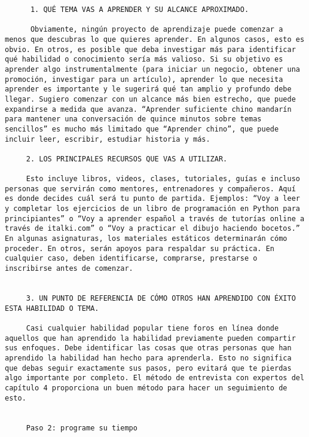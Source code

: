 \begin{verbatim}
	  1. QUÉ TEMA VAS A APRENDER Y SU ALCANCE APROXIMADO.
	  
	  Obviamente, ningún proyecto de aprendizaje puede comenzar a menos que descubras lo que quieres aprender. En algunos casos, esto es obvio. En otros, es posible que deba investigar más para identificar qué habilidad o conocimiento sería más valioso. Si su objetivo es aprender algo instrumentalmente (para iniciar un negocio, obtener una promoción, investigar para un artículo), aprender lo que necesita aprender es importante y le sugerirá qué tan amplio y profundo debe llegar. Sugiero comenzar con un alcance más bien estrecho, que puede expandirse a medida que avanza. “Aprender suficiente chino mandarín para mantener una conversación de quince minutos sobre temas sencillos” es mucho más limitado que “Aprender chino”, que puede incluir leer, escribir, estudiar historia y más.
	 
	 2. LOS PRINCIPALES RECURSOS QUE VAS A UTILIZAR.
	 
	 Esto incluye libros, videos, clases, tutoriales, guías e incluso personas que servirán como mentores, entrenadores y compañeros. Aquí es donde decides cuál será tu punto de partida. Ejemplos: “Voy a leer y completar los ejercicios de un libro de programación en Python para principiantes” o “Voy a aprender español a través de tutorías online a través de italki.com” o “Voy a practicar el dibujo haciendo bocetos.” En algunas asignaturas, los materiales estáticos determinarán cómo proceder. En otros, serán apoyos para respaldar su práctica. En cualquier caso, deben identificarse, comprarse, prestarse o inscribirse antes de comenzar.
	 
	 
	 3. UN PUNTO DE REFERENCIA DE CÓMO OTROS HAN APRENDIDO CON ÉXITO ESTA HABILIDAD O TEMA.
	 
	 Casi cualquier habilidad popular tiene foros en línea donde aquellos que han aprendido la habilidad previamente pueden compartir sus enfoques. Debe identificar las cosas que otras personas que han aprendido la habilidad han hecho para aprenderla. Esto no significa que debas seguir exactamente sus pasos, pero evitará que te pierdas algo importante por completo. El método de entrevista con expertos del capítulo 4 proporciona un buen método para hacer un seguimiento de esto.
	 
	 
	 Paso 2: programe su tiempo
	 

\end{verbatim}
